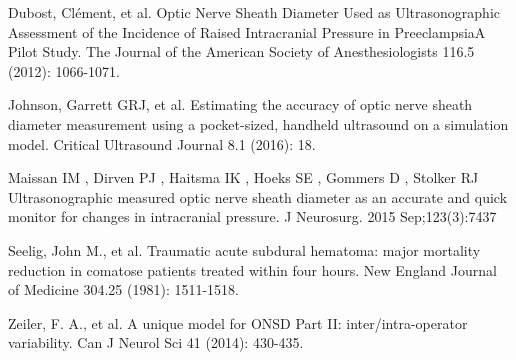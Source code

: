 \documentclass{llncs}
\begin{document}
%
%
\begin{thebibliography}{}
%
Dubost, Clément, et al. 
Optic Nerve Sheath Diameter Used as Ultrasonographic Assessment of the Incidence
of Raised Intracranial Pressure in PreeclampsiaA Pilot Study.  
The Journal of the American Society of Anesthesiologists 116.5 (2012): 1066-1071.

Johnson, Garrett GRJ, et al. 
Estimating the accuracy of optic nerve sheath diameter measurement using a
pocket-sized, handheld ultrasound on a simulation model.  Critical Ultrasound
Journal 8.1 (2016): 18.

Maissan IM , Dirven PJ , Haitsma IK , Hoeks SE , Gommers D , Stolker RJ 
Ultrasonographic measured optic nerve sheath diameter as an accurate and quick
monitor for changes in intracranial pressure. 
J Neurosurg. 2015 Sep;123(3):7437

Seelig, John M., et al. 
Traumatic acute subdural hematoma: major mortality reduction in comatose
patients treated within four hours.
New England Journal of Medicine 304.25 (1981): 1511-1518.

Zeiler, F. A., et al. 
A unique model for ONSD Part II: inter/intra-operator variability. 
Can J Neurol Sci 41 (2014): 430-435.


\end{thebibliography}
\end{document}
